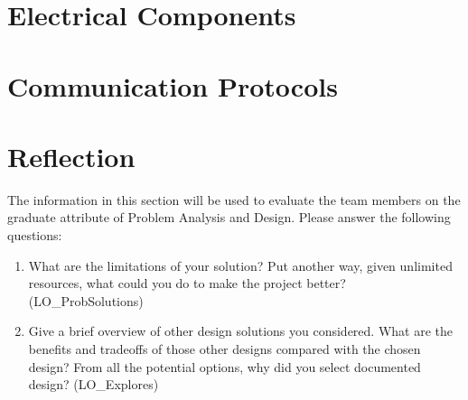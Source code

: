\documentclass[12pt, titlepage]{article}
\begin{document}
\section{Electrical Components}

\section{Communication Protocols}

\section{Reflection}

The information in this section will be used to evaluate the team members on the
graduate attribute of Problem Analysis and Design.  Please answer the following questions:

\begin{enumerate}
  \item What are the limitations of your solution?  Put another way, given
  unlimited resources, what could you do to make the project better? (LO\_ProbSolutions)
  \item Give a brief overview of other design solutions you considered.  What
  are the benefits and tradeoffs of those other designs compared with the chosen
  design?  From all the potential options, why did you select documented design?
  (LO\_Explores)
\end{enumerate}
\end{document}
